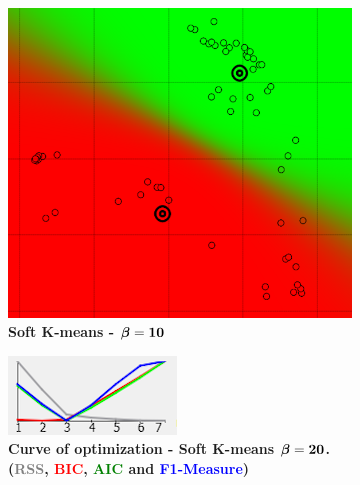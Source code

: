 \begin{figure}[!h]
\centering
	\begin{subfigure}[t]{0.25\textwidth}
    \centering
	\includegraphics[height=0.08\textheight]{./clustering/opt_BIC_k_soft_beta_20_range7.png}
	\caption{\bf Soft K-means - $\boldsymbol \beta \bf = 10$}
	\end{subfigure}
    \hspace{20mm}
    \begin{subfigure}[t]{0.50\textwidth}
    \centering
	\includegraphics[height=0.08\textheight]{./clustering/curve_opt_BIC_k_soft_beta_20_range7.png}
	\caption{\bf Curve of optimization - Soft K-means $\boldsymbol \beta \bf = 20$. (\textcolor{gray}{RSS}, \textcolor{red}{BIC}, \textcolor{green}{AIC} and \textcolor{blue}{F1-Measure})}
	\end{subfigure}\\
    \begin{subfigure}[t]{0.25\textwidth}
    \centering

\end{subfigure}
\end{figure}
